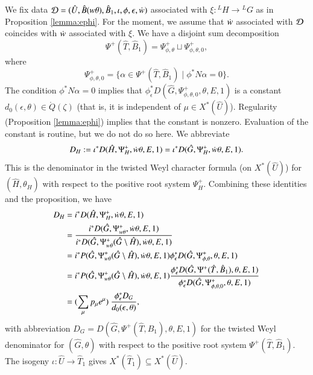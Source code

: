 We fix data $\mathcal D=(\hat U,\hat B(w\theta),\hat
B_1,\iota,\phi,\epsilon,\dot w)$ associated with $\xi:{}^LH\to{}^LG$ as
in Proposition \ref{lemma:ephi}.  For the moment, we assume that
$\dot w$ associated with $\mathcal D$ coincides with $\dot w$ associated with
$\xi$.  We have a disjoint sum decomposition
\[
\Psi^+(\hat T,\hat B_1) = \Psi_{\phi,\theta}^+\sqcup \Psi_{\phi,\theta,0}^+,
\]
where 
\[
\Psi_{\phi,\theta,0}^+ = \{\alpha\in \Psi^+(\hat T,\hat B_1)\mid \phi^* N\alpha=0\}.
\]
The condition $\phi^* N\alpha=0$ implies that
$\phi^*_\epsilon D(\hat G,\Psi_{\phi,\theta,0}^+,\theta,E,1)$ is a
constant $d_0(\epsilon,\theta)\in\ring{Q}(\zeta)$ (that is, it is independent
of $\mu\in X^*(\hat U)$).  Regularity (Proposition \ref{lemma:ephi})
implies that the constant is nonzero.  Evaluation of the constant is
routine, but we do not do so here.  We abbreviate
\begin{align*}
D_H := \iota^* D(\hat H,\Psi^+_H,\dot w\theta,E,1) = \iota^* D(\hat G,\Psi^+_H,\dot w\theta,E,1).
\end{align*}
This is the denominator in the twisted Weyl character formula (on
$X^*(\hat U)$) for $(\hat H,\theta_H)$
with respect to the positive root system $\Psi^+_H$.
Combining these identities and the proposition, we have
\begin{align}\label{eqn:DHDG}
\begin{split}
D_H &= i^* D(\hat H,\Psi^+_H,\dot w\theta,E,1)\\
&=\frac{i^*D(\hat G,\Psi_{w\theta}^+,\dot w\theta,E,1)}
{i^*D(\hat G,\Psi_{w\theta}^+(\hat G\setminus\hat H),\dot w\theta,E,1)}\\
&=
{i^*P(\hat G,\Psi_{w\theta}^+(\hat G\setminus\hat H),\dot w\theta,E,1)}
\phi^*_\epsilon D(\hat G,\Psi_{\phi,\theta}^+,\theta,E,1)\\
&=
{i^*P(\hat G,\Psi_{w\theta}^+(\hat G\setminus\hat H),\dot w\theta,E,1)}
\frac{\phi^*_\epsilon D(\hat G,\Psi^+(\hat T,\hat B_1),\theta,E,1)}
{\phi^*_\epsilon D(\hat G,\Psi_{\phi,\theta,0}^+,\theta,E,1)}\\
&=
(\sum_{\mu} p_\mu e^\mu) 
\ \frac{\phi^*_\epsilon D_G}{
d_0(\epsilon,\theta)},
\end{split}
\end{align}
with abbreviation $D_G= D(\hat G,\Psi^+(\hat T,\hat B_1),\theta,E,1)$
for the twisted Weyl denominator for $(\hat G,\theta)$ with respect to
the positive root system $\Psi^+(\hat T,\hat B_1)$.  The isogeny
$\iota:\hat U\to\hat T_1$ gives $X^*(\hat T_1)\subseteq X^*(\hat U)$.


